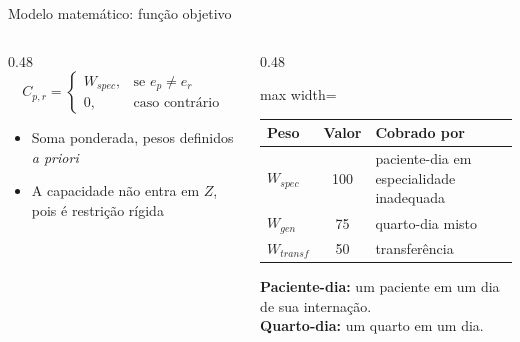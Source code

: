\documentclass[aspectratio=169,10pt]{beamer}
\newcommand{\framerefs}{}
\newcommand{\slidecites}[1]{\gdef\framerefs{Referências: \cite{#1}}}
\gdef\framerefs{}%
\begin{document}
\begin{frame}{Modelo matemático: função objetivo}
    \slidecites{schafer2023combining, ceschia2011local, demeester2010hybrid, talbi2009metaheuristics}
    \centering

    \vspace{0.5cm}
    \begin{columns}[c]
        \begin{column}{0.48\textwidth}
            \[
                C_{p,r} =
                \begin{cases}
                    W_{spec}, & \text{se } e_p \neq e_r \\
                    0, & \text{caso contrário}
                \end{cases}
            \]
            \begin{itemize}
                \item Soma ponderada, pesos definidos \textit{a priori}
                \item A capacidade não entra em $Z$, pois é restrição rígida
            \end{itemize}
        \end{column}
        \begin{column}{0.48\textwidth}
            \centering
            \small
            \begin{adjustbox}{max width=\linewidth}
            \begin{tabular}{lcl}
                \toprule
                \textbf{Peso} & \textbf{Valor} & \textbf{Cobrado por} \\
                \midrule
                $W_{spec}$ & 100 & paciente-dia em especialidade inadequada \\
                $W_{gen}$ & 75 & quarto-dia misto \\
                $W_{transf}$ & 50 & transferência \\
                \bottomrule
            \end{tabular}
            \end{adjustbox}

            \vspace{0.15cm}
            {\scriptsize \textbf{Paciente-dia:} um paciente em um dia de sua internação.\\ \textbf{Quarto-dia:} um quarto em um dia.\par}
        \end{column}
    \end{columns}
\end{frame}
\end{document}
